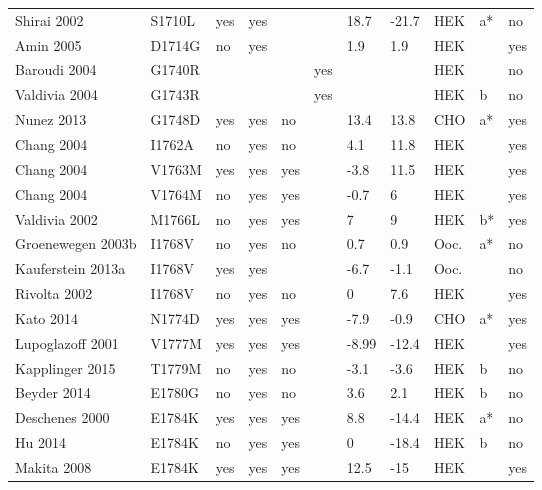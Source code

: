 \begin{tiny}
\begin{longtable}{p{4cm}|l|llll|ll|lll}
Shirai 2002\cite{Shirai2002MutationDB} & S1710L & yes & yes &  &  & 18.7 & -21.7 & HEK & a* & no \\
Amin 2005\cite{Amin2005MutationDB} & D1714G & no & yes &  &  & 1.9 & 1.9 & HEK &  & yes \\
Baroudi 2004\cite{Baroudi2004MutationDB} & G1740R &  &  &  & yes &  &  & HEK &  & no \\
Valdivia 2004\cite{Valdivia2004MutationDB} & G1743R &  &  &  & yes &  &  & HEK & b & no \\
Nunez 2013\cite{Nunez2013MutationDB} & G1748D & yes & yes & no &  & 13.4 & 13.8 & CHO & a* & yes \\
Chang 2004\cite{Chang2004MutationDB} & I1762A & no & yes & no &  & 4.1 & 11.8 & HEK &  & yes \\
Chang 2004\cite{Chang2004MutationDB} & V1763M & yes & yes & yes &  & -3.8 & 11.5 & HEK &  & yes \\
Chang 2004\cite{Chang2004MutationDB} & V1764M & no & yes & yes &  & -0.7 & 6 & HEK &  & yes \\
Valdivia 2002\cite{Valdivia2002MutationDB} & M1766L & no & yes & yes &  & 7 & 9 & HEK & b* & yes \\
Groenewegen 2003b\cite{Groenewegen2003bMutationDB} & I1768V & no & yes & no &  & 0.7 & 0.9 & Ooc. & a* & no \\
Kauferstein 2013a\cite{Kauferstein2013aMutationDB} & I1768V & yes & yes &  &  & -6.7 & -1.1 & Ooc. &  & no \\
Rivolta 2002\cite{Rivolta2002MutationDB} & I1768V & no & yes & no &  & 0 & 7.6 & HEK &  & yes \\
Kato 2014\cite{Kato2014MutationDB} & N1774D & yes & yes & yes &  & -7.9 & -0.9 & CHO & a* & yes \\
Lupoglazoff 2001\cite{Lupoglazoff2001MutationDB} & V1777M & yes & yes & yes &  & -8.99 & -12.4 & HEK &  & yes \\
Kapplinger 2015\cite{Kapplinger2015MutationDB} & T1779M & no & yes & no &  & -3.1 & -3.6 & HEK & b & no \\
Beyder 2014\cite{Beyder2014MutationDB} & E1780G & no & yes & no &  & 3.6 & 2.1 & HEK & b & no \\
Deschenes 2000\cite{Deschenes2000MutationDB} & E1784K & yes & yes & yes &  & 8.8 & -14.4 & HEK & a* & no \\
Hu 2014\cite{Hu2014MutationDB} & E1784K & no & yes & yes &  & 0 & -18.4 & HEK & b & no \\
Makita 2008\cite{Makita2008MutationDB} & E1784K & yes & yes & yes &  & 12.5 & -15 & HEK &  & yes \\

\end{longtable}
\end{tiny}
